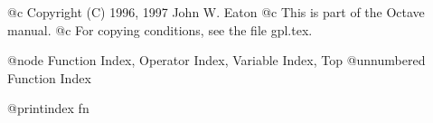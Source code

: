 @c Copyright (C) 1996, 1997 John W. Eaton
@c This is part of the Octave manual.
@c For copying conditions, see the file gpl.tex.

@node Function Index, Operator Index, Variable Index, Top
@unnumbered Function Index

@printindex fn
